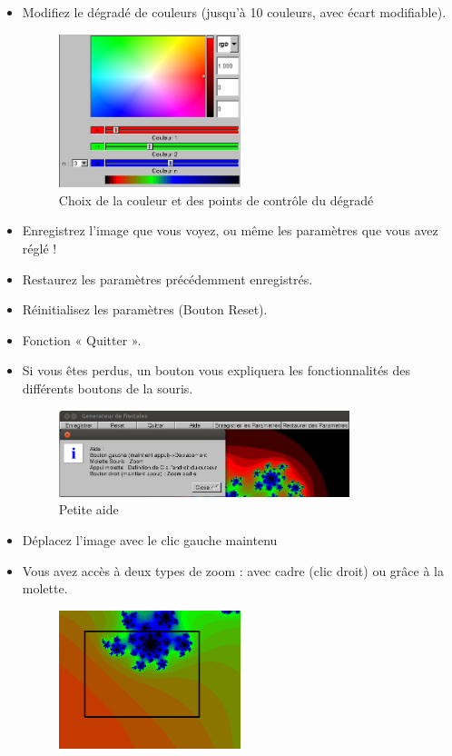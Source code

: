\documentclass[a4paper,11pt]{article} \usepackage[T1]{fontenc} \usepackage[utf8]{inputenc} \usepackage[francais]{babel}
\begin{document}
\begin{itemize}
  \item Modifiez le dégradé de couleurs (jusqu'à 10 couleurs, avec écart modifiable).
        \begin{figure}[H] \begin{center} \includegraphics[width=0.5\textwidth]{Images/ChoixCouleurs.png}
            \caption{Choix de la couleur et des points de contrôle du dégradé}
        \end{center} \end{figure}
  \item Enregistrez l'image que vous voyez, ou même les paramètres que vous avez réglé !
  \item Restaurez les paramètres précédemment enregistrés.
  \item Réinitialisez les paramètres (Bouton Reset).
  \item Fonction « Quitter ».
  \item Si vous êtes perdus, un bouton vous expliquera les fonctionnalités des différents boutons de la souris.
        \begin{figure}[H] \begin{center} \includegraphics[width=0.8\textwidth]{Images/Aide.png}
            \caption{Petite aide}
        \end{center} \end{figure}
  \item Déplacez l’image avec le clic gauche maintenu
  \item Vous avez accès à deux types de zoom : avec cadre (clic droit) ou grâce à la molette.
        \begin{figure}[H] \begin{center} \includegraphics[width=0.5\textwidth]{Images/Cadre.png}

\end{center}
\end{figure}
\end{itemize}
\end{document}
